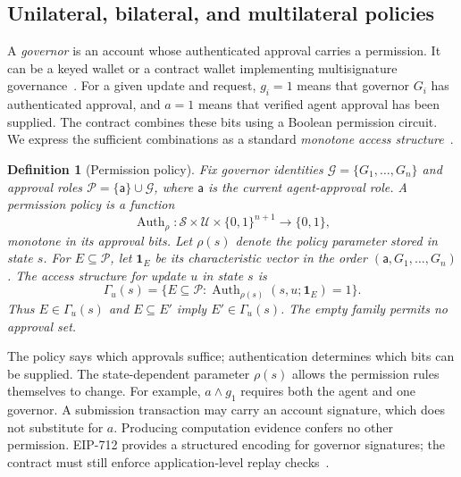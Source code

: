 \documentclass[10pt,letterpaper]{article}
\newtheorem{definition}{Definition}
\newcommand{\G}{\mathcal G}
\newcommand{\Pset}{\mathcal P}
\newcommand{\Auth}{\operatorname{Auth}}
\begin{document}
\subsection{Unilateral, bilateral, and multilateral policies}
A \emph{governor} is an account whose authenticated approval carries a permission. It can be a keyed wallet or a contract wallet implementing multisignature governance~\citep{ethereumaccounts,openzeppelinaccess}. For a given update and request, $g_i=1$ means that governor $G_i$ has authenticated approval, and $a=1$ means that verified agent approval has been supplied. The contract combines these bits using a Boolean permission circuit. We express the sufficient combinations as a standard \emph{monotone access structure}~\citep{benaloh1990}.

\begin{definition}[Permission policy]
\label{def:policy}
Fix governor identities $\G=\{G_1,\ldots,G_n\}$ and approval roles $\Pset=\{\mathsf a\}\cup\G$, where $\mathsf a$ is the current agent-approval role. A permission policy is a function
\[
 \Auth_\rho:\mathcal S\times\mathcal U\times\{0,1\}^{n+1}\longrightarrow\{0,1\},
\]
monotone in its approval bits. Let $\rho(s)$ denote the policy parameter stored in state $s$. For $E\subseteq\Pset$, let $\mathbf 1_E$ be its characteristic vector in the order $(\mathsf a,G_1,\ldots,G_n)$. The access structure for update $u$ in state $s$ is
\[
 \Gamma_u(s)=\{E\subseteq\Pset:\Auth_{\rho(s)}(s,u;\mathbf 1_E)=1\}.
\]
Thus $E\in\Gamma_u(s)$ and $E\subseteq E'$ imply $E'\in\Gamma_u(s)$. The empty family permits no approval set.
\end{definition}

The policy says which approvals suffice; authentication determines which bits can be supplied. The state-dependent parameter $\rho(s)$ allows the permission rules themselves to change. For example, $a\land g_1$ requires both the agent and one governor. A submission transaction may carry an account signature, which does not substitute for $a$. Producing computation evidence confers no other permission. EIP-712 provides a structured encoding for governor signatures; the contract must still enforce application-level replay checks~\citep{eip712}.
\end{document}
